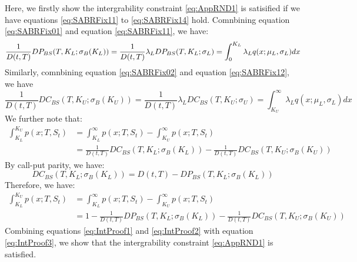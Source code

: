 \documentclass[letterpaper,12pt,titlepage,oneside,final]{book}
\numberwithin{equation}{section}
\theoremstyle{definition}
\begin{document}
Here, we firstly show the intergrability constraint \eqref{eq:AppRND1} is satisified if we have equations \eqref{eq:SABRFix11} to  \eqref{eq:SABRFix14} hold. Comnbining equation  \eqref{eq:SABRFix01} and equation \eqref{eq:SABRFix11}, we have:
 \begin{equation}
	 \frac{1}{D(t,T)} DP_{BS}(T,K_{L};\sigma_{B}(K_{L}))=\frac{1}{D(t,T)} \lambda_{L} DP_{BS}(T,K_{L};\sigma_{L})=\int_{0}^{K_{L}}	\lambda_{L}   q(x;\mu_{L},\sigma_{L}) dx\\
 \label{eq:IntProof1}
 \end{equation}
 Similarly, comnbining equation  \eqref{eq:SABRFix02} and equation \eqref{eq:SABRFix12}, we have
 \begin{equation}
 \frac{1}{D(t,T)} DC_{BS}(T,K_{U};\sigma_{B}(K_{U}))=\frac{1}{D(t,T)} \lambda_{L} DC_{BS}(T,K_{U};\sigma_{U})=\int_{K_{U}}^{\infty}	\lambda_{L}   q(x;\mu_{L},\sigma_{L}) dx
 \label{eq:IntProof2}
 \end{equation}
 We further note that:
\begin{equation}
\begin{split}
	\int_{K_{L}}^{K_{U}}p(x;T,S_t) &=\int_{K_L}^{\infty}p(x;T,S_t)-\int_{K_U}^{\infty}p(x;T,S_t)\\
	&=\frac{1}{D(t,T)} DC_{BS}(T,K_{L};\sigma_{B}(K_{L}))-\frac{1}{D(t,T)} DC_{BS}(T,K_{U};\sigma_{B}(K_{U}))
\end{split}
\end{equation}
By call-put parity, we have: 
\[DC_{BS}(T,K_{L};\sigma_{B}(K_{L}))=D(t,T)-DP_{BS}(T,K_{L};\sigma_{B}(K_{L}))\]
Therefore, we have:
\begin{equation}
	\begin{split}
		\int_{K_{L}}^{K_{U}}p(x;T,S_t) &=\int_{K_L}^{\infty}p(x;T,S_t)-\int_{K_U}^{\infty}p(x;T,S_t)\\
		&=1-\frac{1}{D(t,T)} DP_{BS}(T,K_{L};\sigma_{B}(K_{L}))-\frac{1}{D(t,T)} DC_{BS}(T,K_{U};\sigma_{B}(K_{U}))
	\end{split}
	\label{eq:IntProof3}
	\end{equation}
Combining equations \eqref{eq:IntProof1} and \eqref{eq:IntProof2} with equation \eqref{eq:IntProof3}, we show that  the intergrability constraint \eqref{eq:AppRND1} is satisfied.
\end{document}
